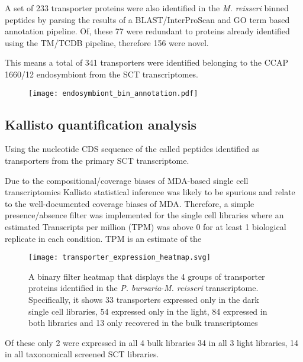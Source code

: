 {{A set of 233 
transporter proteins were also identified 
in the \textit{M. reisseri} binned peptides
by parsing the results of a 
BLAST/InterProScan and GO term based annotation pipeline.
Of, these 77 were redundant to proteins already identified using
the TM/TCDB pipeline, therefore 156 were novel.

This means a total of 341 transporters were identified 
belonging to the CCAP 1660/12 endosymbiont from the SCT transcriptomes. 







\begin{figure}
    \texttt{[image: endosymbiont\_bin\_annotation.pdf]}
    \caption{}
    \label{BLAST hits at a more stringent threshold than 
    that used in the binning thus the lack of 100 annotation.}
\end{figure}

\subsection{Kallisto quantification analysis}

Using the nucleotide CDS sequence of the called peptides identified as transporters
from the primary SCT transcriptome. 

Due to the compositional/coverage biases of MDA-based single cell transcriptomics 
Kallisto statistical inference was likely to be spurious and relate to the 
well-documented coverage biases of MDA. Therefore, a simple presence/absence
filter was implemented for the single cell libraries where an estimated
Transcripts per million (TPM) was above 0 for at least 1 biological replicate
in each condition. 
TPM is an estimate of the 


\begin{figure}
    \texttt{[image: transporter\_expression\_heatmap.svg]}
    \caption{A binary filter heatmap that displays the 4 groups of transporter
        proteins identified in the \textit{P. bursaria}-\textit{M. reisseri} 
        transcriptome.  Specifically, it shows 33 transporters expressed only
        in the dark single cell libraries, 54 expressed only in the light,
    84 expressed in both libraries and 13 only recovered in the bulk transcriptomes}
    \label{fig:binary_expression_heatmap}
\end{figure}


Of these only 2 were expressed in all 4 bulk libraries 34 in all 3 light libraries, 14 in all taxonomicall screened SCT libraries.

}}

